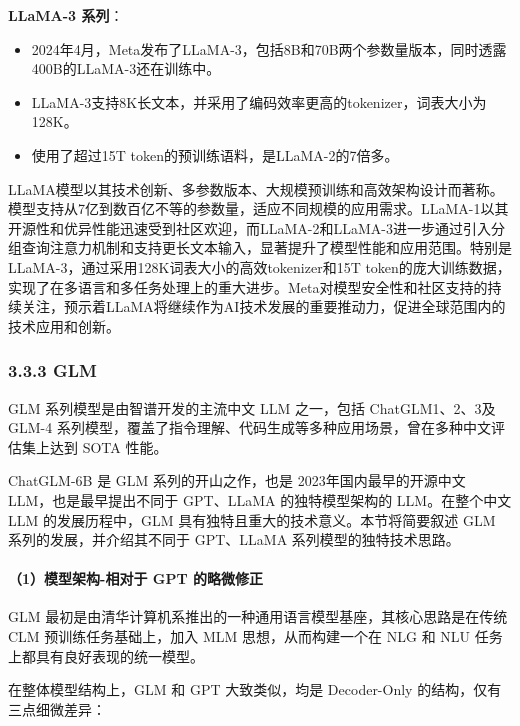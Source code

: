 \documentclass[
]{article}
\providecommand{\tightlist}{%
  \setlength{\itemsep}{0pt}\setlength{\parskip}{0pt}}
\begin{document}
\textbf{LLaMA-3 系列}：

\begin{itemize}
\tightlist
\item
  2024年4月，Meta发布了LLaMA-3，包括8B和70B两个参数量版本，同时透露400B的LLaMA-3还在训练中。
\item
  LLaMA-3支持8K长文本，并采用了编码效率更高的tokenizer，词表大小为128K。
\item
  使用了超过15T token的预训练语料，是LLaMA-2的7倍多。
\end{itemize}

LLaMA模型以其技术创新、多参数版本、大规模预训练和高效架构设计而著称。模型支持从7亿到数百亿不等的参数量，适应不同规模的应用需求。LLaMA-1以其开源性和优异性能迅速受到社区欢迎，而LLaMA-2和LLaMA-3进一步通过引入分组查询注意力机制和支持更长文本输入，显著提升了模型性能和应用范围。特别是LLaMA-3，通过采用128K词表大小的高效tokenizer和15T
token的庞大训练数据，实现了在多语言和多任务处理上的重大进步。Meta对模型安全性和社区支持的持续关注，预示着LLaMA将继续作为AI技术发展的重要推动力，促进全球范围内的技术应用和创新。

\subsubsection{3.3.3 GLM}\label{glm}

GLM 系列模型是由智谱开发的主流中文 LLM 之一，包括 ChatGLM1、2、3及 GLM-4
系列模型，覆盖了指令理解、代码生成等多种应用场景，曾在多种中文评估集上达到
SOTA 性能。

ChatGLM-6B 是 GLM 系列的开山之作，也是 2023年国内最早的开源中文
LLM，也是最早提出不同于 GPT、LLaMA 的独特模型架构的 LLM。在整个中文 LLM
的发展历程中，GLM 具有独特且重大的技术意义。本节将简要叙述 GLM
系列的发展，并介绍其不同于 GPT、LLaMA 系列模型的独特技术思路。

\paragraph{（1）模型架构-相对于 GPT
的略微修正}\label{ux6a21ux578bux67b6ux6784-ux76f8ux5bf9ux4e8e-gpt-ux7684ux7565ux5faeux4feeux6b63}

GLM 最初是由清华计算机系推出的一种通用语言模型基座，其核心思路是在传统
CLM 预训练任务基础上，加入 MLM 思想，从而构建一个在 NLG 和 NLU
任务上都具有良好表现的统一模型。

在整体模型结构上，GLM 和 GPT 大致类似，均是 Decoder-Only
的结构，仅有三点细微差异：
\end{document}
